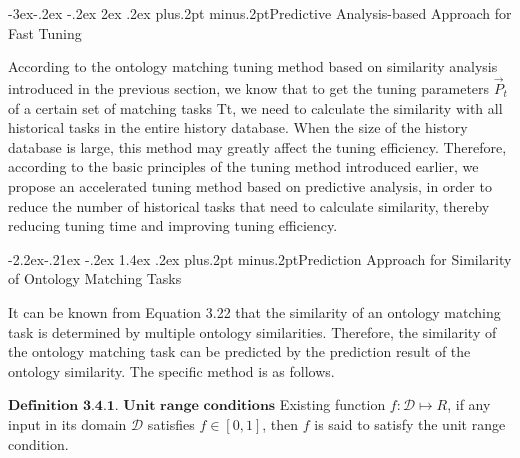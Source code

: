 \documentclass[twoside]{article}
\makeatletter
\def\subsection{\@startsection{subsection}{2}{\z@}%
 {-3ex\@plus -.2ex \@minus -.2ex}%
 {2ex \@plus.2ex}%
{\normalfont\normalsize\protect\baselineskip=12.5pt plus.2pt minus.2pt\bfseries}}
\def\subsubsection{\@startsection{subsubsection}{3}{\z@}%
 {-2.2ex\@plus -.21ex \@minus -.2ex}%
 {1.4ex \@plus.2ex}
{\normalfont\normalsize\protect\baselineskip=12pt plus.2pt minus.2pt\sl}}
\makeatother
\begin{document}
\subsection{Predictive Analysis-based Approach for Fast Tuning}

According to the ontology matching tuning method based on similarity analysis introduced in the previous section, we know that to get the tuning parameters $\vec{P}_{t}$ of a certain set of matching tasks Tt, we need to calculate the similarity with all historical tasks in the entire history database. When the size of the history database is large, this method may greatly affect the tuning efficiency. Therefore, according to the basic principles of the tuning method introduced earlier, we propose an accelerated tuning method based on predictive analysis, in order to reduce the number of historical tasks that need to calculate similarity, thereby reducing tuning time and improving tuning efficiency.

\subsubsection{Prediction Approach for Similarity of Ontology Matching Tasks}

It can be known from Equation 3.22 that the similarity of an ontology matching task is determined by multiple ontology similarities. Therefore, the similarity of the ontology matching task can be predicted by the prediction result of the ontology similarity. The specific method is as follows.

$\textbf{Definition 3.4.1.  Unit range conditions}$ Existing function $f: \mathcal{D} \mapsto R$, if any input in its domain $\mathcal{D}$ satisfies $f \in[0,1]$, then $f$ is said to satisfy the unit range condition.
\end{document}

